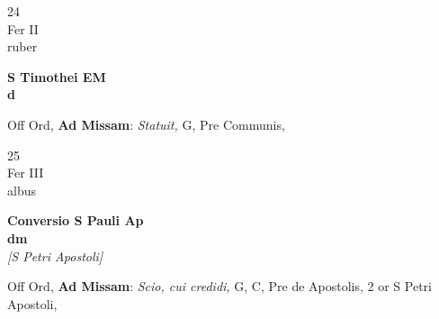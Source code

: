 \documentclass[10pt, openany]{book}
\begin{document}
        \begin{center}
            \begin{minipage}{3.5in}
                \vspace{2em}
                \begin{minipage}{0.5in}
                    {\Huge 24} \\
                    {\normalsize Fer II} \\
                    {\normalsize ruber}
                \end{minipage}
                \begin{minipage}{3.0in}
                    \textbf{ \large S Timothei EM \\
                    \textnormal{\normalsize d}} \\ 
                \end{minipage}
                \begin{justify}Off Ord, \textbf{Ad Missam}: \textit{Statuit,} G, Pre Communis,  
                \end{justify}
            \end{minipage}
        \end{center}
    
        \begin{center}
            \begin{minipage}{3.5in}
                \vspace{2em}
                \begin{minipage}{0.5in}
                    {\Huge 25} \\
                    {\normalsize Fer III} \\
                    {\normalsize albus}
                \end{minipage}
                \begin{minipage}{3.0in}
                    \textbf{ \large Conversio S Pauli Ap \\
                    \textnormal{\normalsize dm}} \\ \textit{[S Petri Apostoli]} \\ 
                \end{minipage}
                \begin{justify}Off Ord, \textbf{Ad Missam}: \textit{Scio, cui credidi,} G, C, Pre de Apostolis, 2 or S Petri Apostoli,  
                \end{justify}
            \end{minipage}
        \end{center}
    
\end{document}
